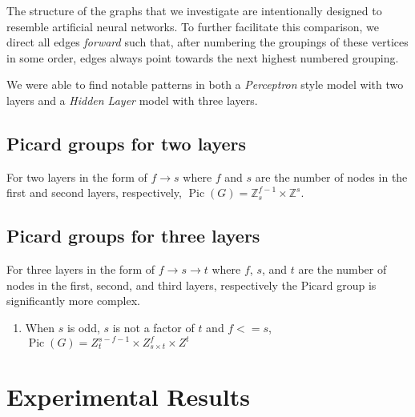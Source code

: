 \documentclass[11pt,reqno]{amsart}
\DeclareMathOperator{\Pic}{Pic}
\theoremstyle{definition}
\theoremstyle{plain}
\begin{document}
	The structure of the graphs that we investigate are intentionally designed to resemble artificial neural networks.
	To further facilitate this comparison, we direct all edges \textit{forward} such that, after numbering the groupings
	of these vertices in some order, edges always point towards the next highest numbered grouping.

	We were able to find notable patterns in both a \textit{Perceptron} style model with two layers and a
	\textit{Hidden Layer} model with three layers.

	\subsection{Picard groups for two layers}
		For two layers in the form of $f \rightarrow s$ where $f$ and $s$ are the number of nodes in the first and
		second layers, respectively, $\Pic(G) = \mathbb{Z}_{s}^{f-1} \times \mathbb{Z}^s$.

	\subsection{Picard groups for three layers}
		For three layers in the form of $f \rightarrow s \rightarrow t$ where $f$, $s$, and $t$ are the number of nodes
		in the first, second, and third layers, respectively the Picard group is significantly more complex.

		\begin{enumerate}
			\item When $s$ is odd, $s$ is not a factor of $t$ and $f <= s$,
				$\Pic(G) = Z_{t}^{s-f-1} \times Z_{s \times t}^{f} \times Z^t$
		\end{enumerate}

%


\section{Experimental Results}


\end{document}
